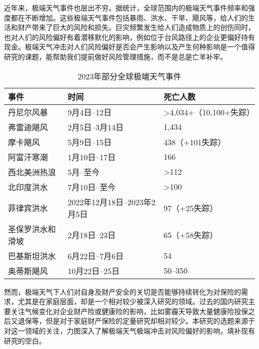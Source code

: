 近年来，极端天气事件也层出不穷。据统计，全球范围内的极端天气事件频率和强度都在不断增加。这些极端天气事件包括暴雨、洪水、干旱、飓风等，给人们的生活和财产带来了巨大的风险和损失。巨灾频繁发生给人们造成物质上的创伤同时，也对人们的风险偏好有着潜移默化的影响，例如位于台风路径上的企业更偏好持有现金\citep{杨娜娜2019自然灾害与企业现金持有}。极端天气冲击对人们风险偏好是否会产生影响以及产生何种影响是一个值得研究的课题，能帮助我们提前做好风险管理措施，而不是总是亡羊补牢。

\begin{table}[H]
    \centering
    \caption{2023年部分全球极端天气事件}
    \begin{tabular}{lll}
        \toprule
        事件       & 时间                    & 死亡人数                            \\
        \midrule
        丹尼尔风暴    & 9月4日–12日              & \textgreater{}4,034+（10,100+失踪） \\
        弗雷迪飓风    & 2月5日–3月14日            & 1,434                           \\
        摩卡飓风     & 5月9日–15日              & 438（+101失踪）                     \\
        阿富汗寒潮    & 1月10日–17日             & 166                             \\
        西北美洲热浪   & 5月–至今                 & \textgreater{}112               \\
        北印度洪水    & 7月10日–至今              & \textgreater{}100               \\
        菲律宾洪水    & 2022年12月18日–2023年2月5日 & 97（+25失踪）                       \\
        圣保罗洪水和滑坡 & 2月18日–23日             & 65（+58失踪）                       \\
        巴基斯坦洪水   & 6月22日–7月6日            & 54                              \\
        奥蒂斯飓风    & 10月22日–25日            & 50–350                          \\
        \bottomrule
    \end{tabular}
\end{table}

然而，极端天气下人们对自身及财产安全的关切是否能够持续转化为对保险的需求，尤其是在家庭层面，却是一个相对较少被深入研究的领域。过去的国内研究主要关注气候变化对企业财产险或健康险的影响，比如雾霾天导致大量健康险投保之后又退保等，但是对于家庭财产保险的定量研究却相对较少。本研究的选题来源于对这一领域的关注，力图深入了解极端天气极端冲击对风险偏好的影响，填补现有研究的空白。

